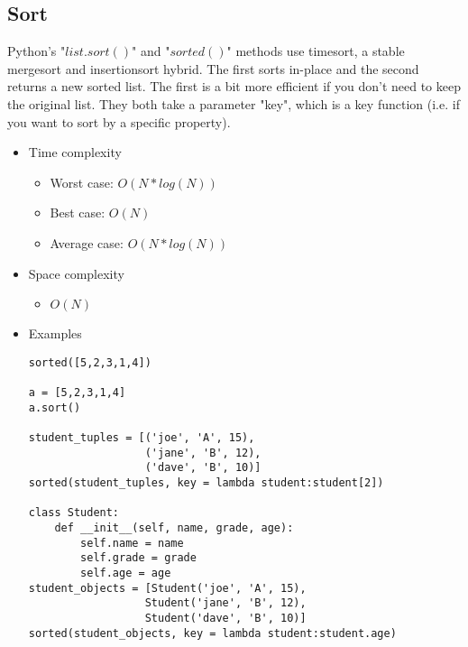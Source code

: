\documentclass[a4paper, 11.25pt]{article}
\begin{document}
\subsection{Sort}
Python's "$list.sort()$" and "$sorted()$" methods use timesort, a stable mergesort and insertionsort hybrid. The first sorts in-place and the second returns a new sorted list. The first is a bit more efficient if you don't need to keep the original list. They both take a parameter "key", which is a key function (i.e. if you want to sort by a specific property).

\begin{itemize}
    \item Time complexity
    \begin{itemize}
        \item Worst case: $O(N*log(N))$
        \item Best case: $O(N)$
        \item Average case: $O(N*log(N))$
    \end{itemize}
    \item Space complexity
    \begin{itemize}
        \item $O(N)$
    \end{itemize}
    \item Examples
    \begin{lstlisting}[style=PythonStyle]
sorted([5,2,3,1,4])

a = [5,2,3,1,4]
a.sort()

student_tuples = [('joe', 'A', 15),
                  ('jane', 'B', 12),
                  ('dave', 'B', 10)]
sorted(student_tuples, key = lambda student:student[2])

class Student:
    def __init__(self, name, grade, age):
        self.name = name
        self.grade = grade
        self.age = age
student_objects = [Student('joe', 'A', 15),
                  Student('jane', 'B', 12),
                  Student('dave', 'B', 10)]
sorted(student_objects, key = lambda student:student.age)\end{lstlisting}
\end{itemize}
\end{document}
